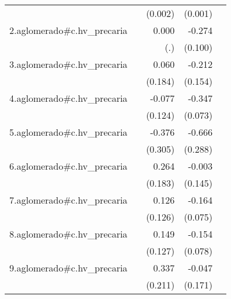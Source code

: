 {\begin{longtable}{l*{4}{D{.}{.}{-1}}}
            &                     &     (0.002)         &     (0.001)         &                     \\
\addlinespace
2.aglomerado#c.hv\_precaria&                     &       0.000         &      -0.274\sym{**} &                     \\
            &                     &         (.)         &     (0.100)         &                     \\
\addlinespace
3.aglomerado#c.hv\_precaria&                     &       0.060         &      -0.212         &                     \\
            &                     &     (0.184)         &     (0.154)         &                     \\
\addlinespace
4.aglomerado#c.hv\_precaria&                     &      -0.077         &      -0.347\sym{***}&                     \\
            &                     &     (0.124)         &     (0.073)         &                     \\
\addlinespace
5.aglomerado#c.hv\_precaria&                     &      -0.376         &      -0.666\sym{*}  &                     \\
            &                     &     (0.305)         &     (0.288)         &                     \\
\addlinespace
6.aglomerado#c.hv\_precaria&                     &       0.264         &      -0.003         &                     \\
            &                     &     (0.183)         &     (0.145)         &                     \\
\addlinespace
7.aglomerado#c.hv\_precaria&                     &       0.126         &      -0.164\sym{*}  &                     \\
            &                     &     (0.126)         &     (0.075)         &                     \\
\addlinespace
8.aglomerado#c.hv\_precaria&                     &       0.149         &      -0.154\sym{*}  &                     \\
            &                     &     (0.127)         &     (0.078)         &                     \\
\addlinespace
9.aglomerado#c.hv\_precaria&                     &       0.337         &      -0.047         &                     \\
            &                     &     (0.211)         &     (0.171)         &                     \\

\end{longtable}}
